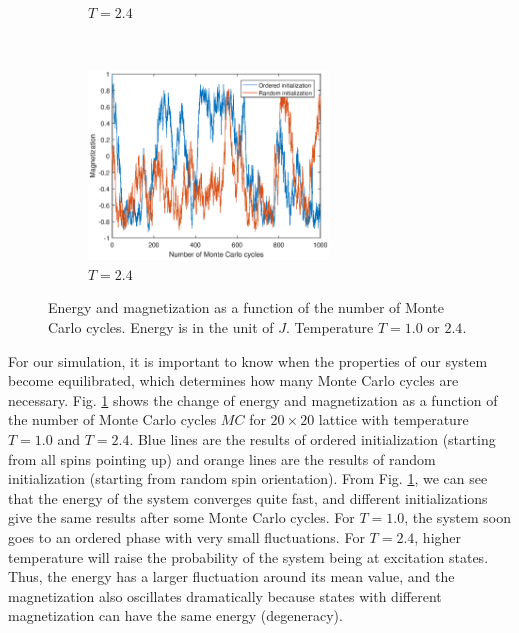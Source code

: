 \begin{figure}[tb]
\begin{subfigure}[tb]{0.5\textwidth}
		\caption{$T=2.4$}
	\end{subfigure}
	~
	\begin{subfigure}[tb]{0.5\textwidth}
		\centering
		\includegraphics[width=0.7\textwidth]{Process_mag_highT.eps}		
		\caption{$T=2.4$}
	\end{subfigure}
	\caption{Energy and magnetization as a function of the number of Monte Carlo cycles. 
	Energy is in the unit of $J$. Temperature $T=1.0$ or $2.4$. }
	\label{fig:process}
\end{figure}
For our simulation, it is important to know when the properties of our system become equilibrated, 
which determines how many Monte Carlo cycles are necessary. 
Fig. \ref{fig:process} shows the change of energy and magnetization as a function of the number of Monte Carlo cycles $MC$ 
for $20 \times 20$ lattice with temperature $T=1.0$ and $T=2.4$. 
Blue lines are the results of ordered initialization (starting from all spins pointing up) 
and orange lines are the results of random initialization (starting from random spin orientation). 
From Fig. \ref{fig:process}, we can see that the energy of the system converges quite fast, 
and different initializations give the same results after some Monte Carlo cycles. 
For $T=1.0$, the system soon goes to an ordered phase with very small fluctuations. 
For $T=2.4$, higher temperature will raise the probability of the system being at excitation states. 
Thus, the energy has a larger fluctuation around its mean value, 
and the magnetization also oscillates dramatically 
because states with different magnetization can have the same energy (degeneracy). 
\par
